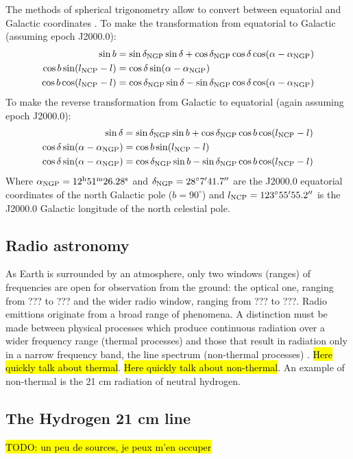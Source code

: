 The methods of spherical trigonometry allow to convert between equatorial and Galactic coordinates \Cite{carroll_introduction_2007}. To make the transformation from equatorial to Galactic (assuming epoch J2000.0):
\begin{align}
    \sin b &= \sin \delta_{\text{NGP}} \sin \delta + \cos \delta_{\text{NGP}} \cos \delta \cos (\alpha - \alpha_{\text{NGP}}) \\
    \cos b \sin(l_{\text{NCP}} - l) &= \cos \delta \sin(\alpha - \alpha_{\text{NGP}}) \\
    \cos b \cos (l_{\text{NCP}} - l) &= \cos \delta_{\text{NGP}} \sin \delta - \sin \delta_{\text{NGP}} \cos \delta \cos(\alpha - \alpha_{\text{NGP}})
\end{align}
To make the reverse transformation from Galactic to equatorial (again assuming epoch J2000.0):
\begin{align}
    \sin \delta &= \sin \delta_{\text{NGP}} \sin b + \cos \delta_{\text{NGP}} \cos b \cos (l_{\text{NCP}} - l) \\
    \cos \delta \sin(\alpha - \alpha_{\text{NGP}}) &= \cos b \sin(l_{\text{NCP}} - l) \\
    \cos \delta \sin(\alpha - \alpha_{\text{NGP}}) &= \cos \delta_{\text{NGP}} \sin b - \sin \delta_{\text{NGP}} \cos b \cos (l_{\text{NCP}} - l)
\end{align}
Where $\alpha_{\text{NGP}} = 12^{\text{h}} 51^{\text{m}} 26.28^{\text{s}}$ and $\delta_{\text{NGP}} = 28^{\circ}7' 41.7''$ are the J2000.0 equatorial coordinates of the north Galactic pole ($b = 90^{\circ}$) and $l_{\text{NCP}} = 123^{\circ} 55' 55.2''$ is the J2000.0 Galactic longitude of the north celestial pole.

\subsection{Radio astronomy}
As Earth is surrounded by an atmosphere, only two windows (ranges) of frequencies are open for observation from the ground: the optical one, ranging from ??? to ??? and the wider radio window, ranging from ??? to ???.
Radio emittions originate from a broad range of phenomena.
A distinction must be made between physical processes which produce continuous radiation over a wider frequency range (thermal processes) and those that result in radiation only in a narrow frequency band, the line spectrum (non-thermal processes) \cite{lauterbach_radio_2022}.
\hl{Here quickly talk about thermal}.
\hl{Here quickly talk about non-thermal}.
An example of non-thermal is the 21 cm radiation of neutral hydrogen.

\subsection{The Hydrogen 21 cm line}
\hl{TODO: un peu de sources, je peux m'en occuper}

